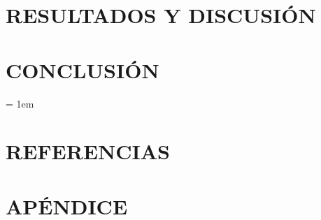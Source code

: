 \documentclass[12pt, oneside]{book}
\begin{document}
\chapter{RESULTADOS Y DISCUSIÓN}
\thispagestyle{empty}


\chapter{CONCLUSIÓN} \label{chp:conclusion}
\thispagestyle{empty}



\chapterformattitleonly

\emergencystretch = 1em
\chapter*{REFERENCIAS}
\printbibliography[heading=none]

\appendix
\chapter*{APÉNDICE}
\renewcommand{\thechapter}{A}


\printindex

%
\end{document}
